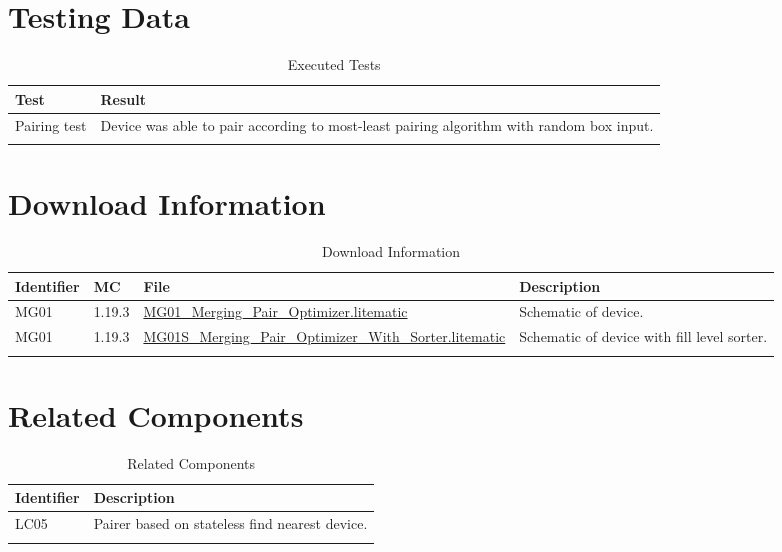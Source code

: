 \documentclass[10pt]{datasheet}
\begin{document}
\section{Testing Data}
\begin{table}[h]
\caption{Executed Tests}
\begin{tabularx}{\textwidth}{l | X}
    \thickhline
    \textbf{Test} & \textbf{Result} \\
    \hline
    Pairing test & Device was able to pair according to most-least pairing algorithm with random box input. \\
    \thickhline
\end{tabularx}
\end{table}

\section{Download Information}
\begin{table}[h]
    \caption{Download Information}
    \begin{tabularx}{\textwidth}{l | l | l | X}
        \thickhline
        \textbf{Identifier} & \textbf{MC} & \textbf{File} & \textbf{Description} \\
        \hline
        MG01 & 1.19.3 & \href{https://github.com/Soontech-Annals/Archive/blob/b56572c0d2b4f182d9e9d41449d8cb2963b923ae/Archive/merging/MG01\%20Merging\%20Pair\%20Optimizer/MG01\_Merging\_Pair\_Optimizer.litematic?raw=1}{MG01\_Merging\_Pair\_Optimizer.litematic} & Schematic of device. \\
        \hline
        MG01 & 1.19.3 & \href{https://github.com/Soontech-Annals/Archive/blob/b56572c0d2b4f182d9e9d41449d8cb2963b923ae/Archive/merging/MG01\%20Merging\%20Pair\%20Optimizer/MG01S\_Merging\_Pair\_Optimizer\_With\_Sorter.litematic?raw=1}{MG01S\_Merging\_Pair\_Optimizer\_With\_Sorter.litematic} & Schematic of device with fill level sorter. \\
        \hline
        \thickhline
    \end{tabularx}
\end{table}

\newpage
\section{Related Components}
\begin{table}[h]
    \caption{Related Components}
    \begin{tabularx}{\textwidth}{ l | l }
        \thickhline
        \textbf{Identifier} & \textbf{Description} \\
        \hline
        LC05 & Pairer based on stateless find nearest device. \\
        \thickhline
    \end{tabularx}
\end{table}
\end{document}
